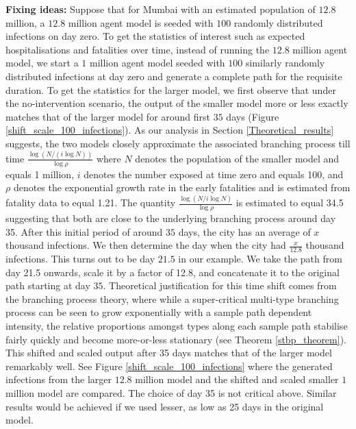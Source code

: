 \documentclass{article}
\theoremstyle{definition}
\begin{document}
{\noindent \bf Fixing ideas:} Suppose that for Mumbai with an  estimated population of $12.8$ million, a $12.8$ million agent model is seeded 
with $100$ randomly distributed infections on day zero. To get the statistics of interest such as expected hospitalisations and fatalities over time, instead of running 
the  $12.8$ million agent model, we start a $1$ million agent model seeded
with $100$ similarly randomly distributed infections at day zero and  generate a complete path for the requisite duration.
To get the statistics for the larger model, we first observe that under the no-intervention scenario,  the output of the smaller model more or less exactly matches that of the larger model
for around first $35$ days (Figure \ref{shift_scale_100_infections}). 
As our analysis in Section \ref{Theoretical_results} suggests, the two models closely approximate the associated branching process till
time $\frac{\log(N/(i\log N))}{\log \rho}$ where $N$ denotes the population of the smaller model and equals 1 million, $i$ denotes the number exposed at time zero and equals 100,
and $\rho$ denotes the exponential growth rate in the early fatalities and is estimated from fatality data to equal 1.21. The quantity  $\frac{\log(N/i \log N)}{\log \rho}$ is estimated to equal 
34.5 
 suggesting that both are close to the underlying branching process  around day  35.  After this initial period of around $35$ days, the city has an average of 
$x$ thousand infections. We then determine  the day when the city had $\frac{x}{12.8}$ thousand infections.
This turns out to be  day $21.5$ in our example. We take the path from day 21.5 onwards, scale it by a factor of 12.8, and concatenate it to the original path
starting at day $35$.  Theoretical justification for this time shift comes from the branching process theory,
where while a super-critical multi-type branching process can be seen to grow exponentially with a sample path dependent intensity, the relative proportions  amongst types along each sample path stabilise fairly quickly and become more-or-less stationary (see Theorem \ref{stbp_theorem}). 
This shifted and scaled output after 35 days matches that of the larger model remarkably well. See Figure    \ref{shift_scale_100_infections} where the generated infections from the larger $12.8$ million model
and the shifted and scaled smaller $1$ million model are compared.  The choice of day 35 is not critical above. Similar results would be achieved
if we used lesser, as low as  25 days in the original model. 
\end{document}
